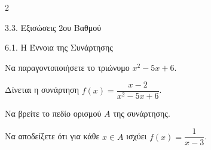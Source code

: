 \begin{ylh}{2}
    \item 3.3. Εξισώσεις 2ου Βαθμού
    \item 6.1. Η Έννοια της Συνάρτησης
\end{ylh}

\begin{alist}
\item Να παραγοντοποιήσετε το τριώνυμο $x^2 - 5x + 6$.
\item Δίνεται η συνάρτηση $f(x) = \dfrac{x - 2}{x^2 - 5x + 6}$.


\begin{rlist}
\item
  Να βρείτε το πεδίο ορισμού ${A}$ της συνάρτησης.
\item
  Να αποδείξετε ότι για κάθε $x \in {A}$ ισχύει $f(x) = \dfrac{1}{x - 3}$.
\end{rlist}
\end{alist}


